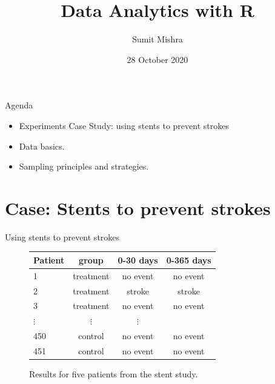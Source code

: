 \documentclass[notes,11pt, aspectratio=169]{beamer}
\title[DAR]{Data Analytics with R}  %
\author{Sumit Mishra} %
\institute[IFMR] %
{
Institute for Financial Management and Research, Sri City \\ %
\medskip
\medskip
\textbf{Introduction to Data} %
}
\date{28 October 2020} %
\begin{document}
\begin{frame}
  \titlepage
\end{frame}

\begin{frame}{Agenda}
\begin{itemize}
\item Experiments Case Study: using stents to prevent strokes
\item Data basics.
\item Sampling principles and strategies.
\end{itemize}
\end{frame}


\section{Case: Stents to prevent strokes}
\begin{frame}{Using stents to prevent strokes}

\begin{figure}[h]
\centering
\begin{tabular}{l ccc}
\hline
Patient	&	group	&	0-30 days 	&	0-365 days \\
\hline
1		&	treatment &	no event &	no event \\
2		&	treatment &	stroke & stroke \\
3		&	treatment &	no event & no event \\
$\vdots$	&	$\vdots$	  &	$\vdots$ \\
450	&	control &	no event &	no event \\
451	&	control &	no event &	no event \\
\hline
\end{tabular}
\caption{Results for five patients from the stent study.}
\label{stentStudyResultsDF}
\end{figure}
\end{frame}
\end{document}
